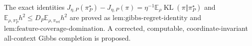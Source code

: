 The exact identities \(J_{\eta,P}(\pi_P^\star)-J_{\eta,P}(\pi)=\eta^{-1}\mathbb E_\rho\operatorname{KL}(\pi\Vert\pi_P^\star)\) and \(\mathbb E_{\rho,\pi_P^\star}h^2\le D_P\mathbb E_{\rho,\pi_{\mathrm{ref}}}h^2\) are proved as \(\text{lem:gibbs-regret-identity}\) and \(\text{lem:feature-coverage-domination}\). A corrected, computable, coordinate-invariant all-context Gibbs completion is proposed.
